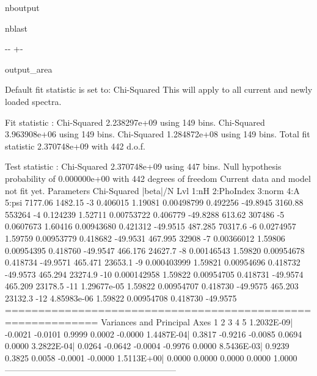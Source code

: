 \documentclass[letterpaper,10pt,english]{sphinxmanual}
\newlength\nbsphinxcodecellspacing
\begin{document}
\begin{sphinxuseclass}{nboutput}
\begin{sphinxuseclass}{nblast}
{

\kern-\sphinxverbatimsmallskipamount\kern-\baselineskip
\kern+\FrameHeightAdjust\kern-\fboxrule
\vspace{\nbsphinxcodecellspacing}

\begin{sphinxuseclass}{output_area}
\begin{sphinxuseclass}{}


\begin{sphinxVerbatim}[commandchars=\\\{\}]
Default fit statistic is set to: Chi-Squared
   This will apply to all current and newly loaded spectra.

Fit statistic  : Chi-Squared              2.238297e+09     using 149 bins.
                 Chi-Squared              3.963908e+06     using 149 bins.
                 Chi-Squared              1.284872e+08     using 149 bins.
Total fit statistic                       2.370748e+09     with 442 d.o.f.

Test statistic : Chi-Squared              2.370748e+09     using 447 bins.
 Null hypothesis probability of 0.000000e+00 with 442 degrees of freedom
 Current data and model not fit yet.
                                   Parameters
Chi-Squared  |beta|/N    Lvl          1:nH    2:PhoIndex        3:norm           4:A         5:psi
7177.06      1482.15      -3      0.406015       1.19081    0.00498799      0.492256      -49.8945
3160.88      553264       -4      0.124239       1.52711    0.00753722      0.406779      -49.8288
613.62       307486       -5     0.0607673       1.60416    0.00943680      0.421312      -49.9515
487.285      70317.6      -6     0.0274957       1.59759    0.00953779      0.418682      -49.9531
467.995      32908        -7    0.00366012       1.59806    0.00954395      0.418760      -49.9547
466.176      24627.7      -8    0.00146543       1.59820    0.00954678      0.418734      -49.9571
465.471      23653.1      -9   0.000403999       1.59821    0.00954696      0.418732      -49.9573
465.294      23274.9     -10   0.000142958       1.59822    0.00954705      0.418731      -49.9574
465.209      23178.5     -11   1.29677e-05       1.59822    0.00954707      0.418730      -49.9575
465.203      23132.3     -12   4.85983e-06       1.59822    0.00954708      0.418730      -49.9575
============================================================
 Variances and Principal Axes
                 1        2        3        4        5
 1.2032E-09| -0.0021  -0.0101   0.9999   0.0002  -0.0000
 1.4487E-04|  0.3817  -0.9216  -0.0085   0.0694   0.0000
 3.2822E-04|  0.0264  -0.0642  -0.0004  -0.9976   0.0000
 8.5436E-03|  0.9239   0.3825   0.0058  -0.0001  -0.0000
 1.5113E+00|  0.0000   0.0000   0.0000   0.0000   1.0000
------------------------------------------------------------


\end{sphinxVerbatim}
\end{sphinxuseclass}
\end{sphinxuseclass}}
\end{sphinxuseclass}
\end{sphinxuseclass}
\end{document}
